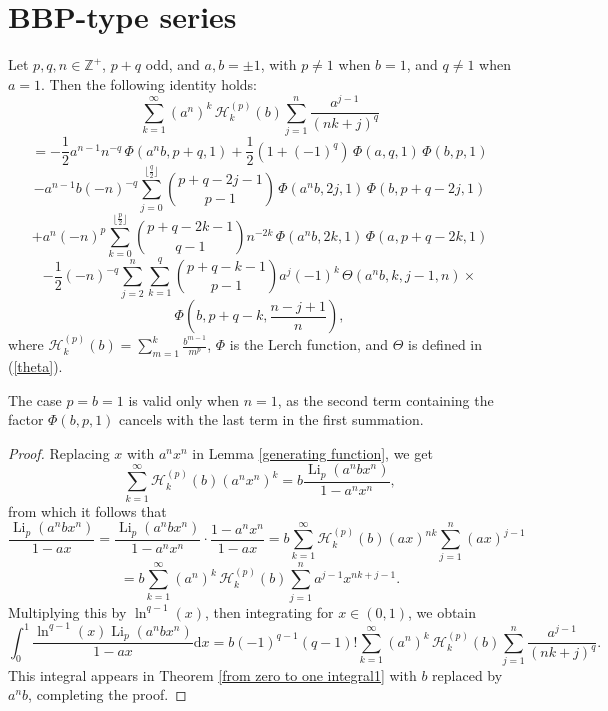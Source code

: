 \documentclass[11pt,reqno]{article}
\begin{document}
\section{BBP-type series}
\begin{theorem} \label{bbp sum1}
	Let $p,q,n\in\mathbb{Z}^{+}$, $p+q$ odd, and $a,b=\pm1$, with $p\neq1$ when $b=1$, and $q\neq1$ when $a=1$. Then the following identity holds:
	\[\sum_{k=1}^\infty {(a^n)}^{k}\, \mathcal{H}_k^{(p)}(b)\sum_{j=1}^{n}\frac{a^{j-1}}{(nk+j)^q}\]
	\[=-\frac12 a^{n-1} n^{-q}\,\Phi(a^nb,p+q,1)+\frac12(1+{(-1)}^{q})\,\Phi(a,q,1)\,\Phi(b,p,1)\]
	\[-a^{n-1}b{(-n)}^{-q}\sum_{j=0}^{\lfloor\frac{q}{2}\rfloor}\binom{p+q-2j-1}{p-1}\,\Phi(a^nb,2j,1)\,\Phi(b,p+q-2j,1)\]
	\[+a^n{(-n)}^{p}\sum_{k=0}^{\lfloor\frac{p}{2}\rfloor}\binom{p+q-2k-1}{q-1}n^{-2k}\,\Phi(a^nb,2k,1)\,\Phi(a,p+q-2k,1)\]
	\[-\frac12 {(-n)}^{-q}\sum_{j=2}^{n}\sum_{k=1}^{q}\binom{p+q-k-1}{p-1}a^{j}{(-1)}^{k}\,\Theta(a^nb,k,j-1,n)\times\]
	\[\Phi\left(b,p+q-k,\frac{n-j+1}{n}\right),\]	
	where $\mathcal{H}_k^{(p)}(b)=\sum_{m=1}^{k}\frac{b^{m-1}}{m^p}$, $\Phi$ is the Lerch function, and $\Theta$ is defined in (\ref{theta}). 
\end{theorem}
\begin{remark}
	The case $p=b=1$ is valid only when $n=1$, as the second term containing the factor $\Phi(b,p,1)$ cancels with the last term in the first summation.
\end{remark}
\begin{proof}
	Replacing $x$ with $a^nx^n$ in Lemma \ref{generating function}, we get
	\[\sum_{k=1}^\infty \mathcal{H}_k^{(p)}(b)(a^nx^n)^k=b\frac{\operatorname{Li}_p(a^nbx^n)}{1-a^nx^n},\]
	from which it follows that
	\[\frac{\operatorname{Li}_p(a^nb x^n)}{1-ax}=\frac{\operatorname{Li}_p(a^nb x^n)}{1-a^n x^n}\cdot \frac{1-a^n x^n}{1-ax}=b\sum_{k=1}^\infty \mathcal{H}_k^{(p)}(b){(ax)}^{nk}\sum_{j=1}^{n}{(ax)}^{j-1}\]
	\[=b\sum_{k=1}^\infty {(a^n)}^{k}\, \mathcal{H}_k^{(p)}(b)\sum_{j=1}^{n} a^{j-1} x^{nk+j-1}.\]
	Multiplying this by $\ln^{q-1}(x)$, then integrating for $x\in(0,1)$, we obtain
	\[\int_0^1\frac{\ln^{q-1}(x)\operatorname{Li}_{p}(a^nb x^{n})}{1-ax}\mathrm{d} x=b{(-1)}^{q-1}(q-1)!\sum_{k=1}^\infty {(a^n)}^{k}\, \mathcal{H}_k^{(p)}(b)\sum_{j=1}^{n}\frac{a^{j-1}}{(nk+j)^q}.\]
	This integral appears in Theorem \ref{from zero to one integral1} with $b$ replaced by $a^nb$, completing the proof.
\end{proof}
\end{document}
